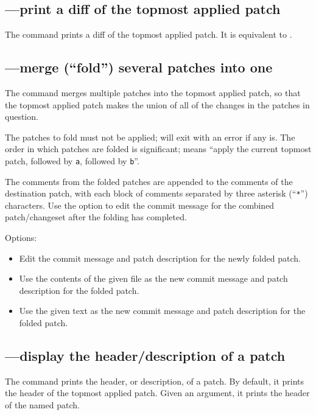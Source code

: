 \subsection{---print a diff of the topmost applied patch}

The  command prints a diff of the topmost applied patch.
It is equivalent to .

\subsection{---merge (``fold'') several patches into one}

The  command merges multiple patches into the topmost
applied patch, so that the topmost applied patch makes the union of
all of the changes in the patches in question.

The patches to fold must not be applied;  will exit with
an error if any is.  The order in which patches are folded is
significant;  means ``apply the current topmost
patch, followed by \texttt{a}, followed by \texttt{b}''.

The comments from the folded patches are appended to the comments of
the destination patch, with each block of comments separated by three
asterisk (``\texttt{*}'') characters.  Use the 
option to edit the commit message for the combined patch/changeset
after the folding has completed.

Options:
\begin{itemize}
\item[\hgxopt{mq}{qfold}{-e}] Edit the commit message and patch description
  for the newly folded patch.
\item[\hgxopt{mq}{qfold}{-l}] Use the contents of the given file as the new
  commit message and patch description for the folded patch.
\item[\hgxopt{mq}{qfold}{-m}] Use the given text as the new commit message
  and patch description for the folded patch.
\end{itemize}

\subsection{---display the header/description of a patch}

The  command prints the header, or description, of a
patch.  By default, it prints the header of the topmost applied patch.
Given an argument, it prints the header of the named patch.

